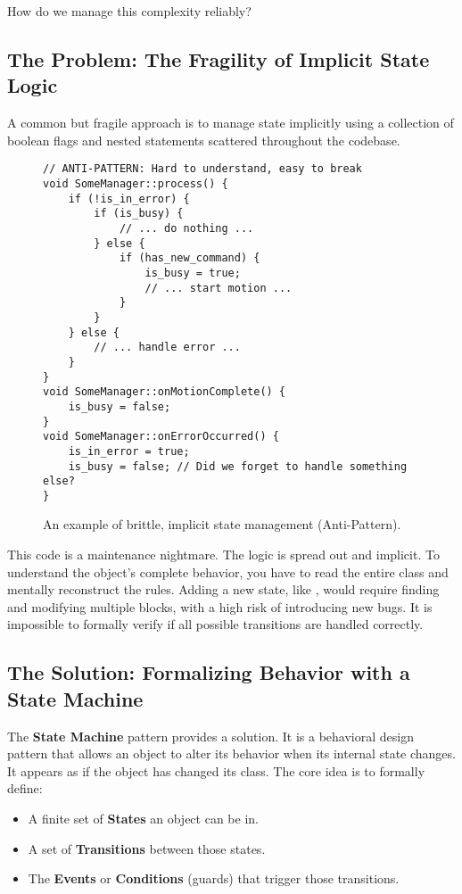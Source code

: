 How do we manage this complexity reliably?

\subsection{The Problem: The Fragility of Implicit State Logic}
\label{subsec:implicit_state_problem}

A common but fragile approach is to manage state implicitly using a collection of boolean flags and nested  statements scattered throughout the codebase.

\begin{figure}[H]
\captionsetup{type=lstlisting}
\setlength{\abovecaptionskip}{-10pt}
\setlength{\belowcaptionskip}{-5pt}
\begin{verbatim}
// ANTI-PATTERN: Hard to understand, easy to break
void SomeManager::process() {
    if (!is_in_error) {
        if (is_busy) {
            // ... do nothing ...
        } else {
            if (has_new_command) {
                is_busy = true;
                // ... start motion ...
            }
        }
    } else {
        // ... handle error ...
    }
}
void SomeManager::onMotionComplete() {
    is_busy = false;
}
void SomeManager::onErrorOccurred() {
    is_in_error = true;
    is_busy = false; // Did we forget to handle something else?
}
\end{verbatim}
\caption{An example of brittle, implicit state management (Anti-Pattern).}
\label{lst:implicit-state}
\end{figure}

This code is a maintenance nightmare. The logic is spread out and implicit. To understand the object's complete behavior, you have to read the entire class and mentally reconstruct the rules. Adding a new state, like , would require finding and modifying multiple  blocks, with a high risk of introducing new bugs. It is impossible to formally verify if all possible transitions are handled correctly.

\subsection{The Solution: Formalizing Behavior with a State Machine}
\label{subsec:state_machine_solution}

The \textbf{State Machine} pattern provides a solution. It is a behavioral design pattern that allows an object to alter its behavior when its internal state changes. It appears as if the object has changed its class. The core idea is to formally define:
\begin{itemize}
    \item A finite set of \textbf{States} an object can be in.
    \item A set of \textbf{Transitions} between those states.
    \item The \textbf{Events} or \textbf{Conditions} (guards) that trigger those transitions.
\end{itemize}

